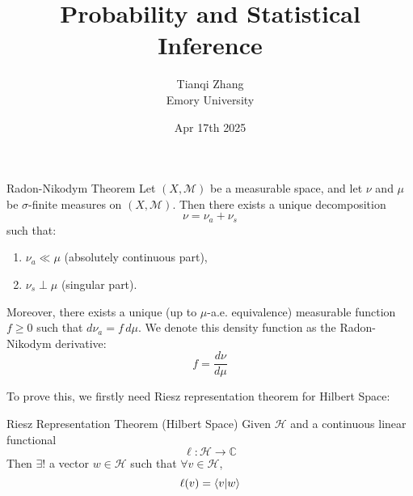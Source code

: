 

\title{\textbf{%
               Probability and Statistical Inference}}
\author{Tianqi Zhang\\
Emory University}
\date{Apr 17th 2025}


\maketitle
\setcounter{tocdepth}{1} %


\begin{thm}{Radon-Nikodym Theorem}
Let $(X, \mathcal{M})$ be a measurable space, and let $\nu$ and $\mu$ be $\sigma$-finite measures on $(X, \mathcal{M})$. Then there exists a unique decomposition
$$\nu = \nu_a + \nu_s$$
such that:
\begin{enumerate}
	\item $\nu_a \ll \mu$ (absolutely continuous part),
	\item $\nu_s \perp \mu$ (singular part).
\end{enumerate}
Moreover, there exists a unique (up to $\mu$-a.e. equivalence) measurable function $f \geq 0$ such that
$d\nu_a = f \, d\mu$.
We denote this density function as the Radon-Nikodym derivative:
$$f = \frac{d\nu}{d\mu}$$
\end{thm}

To prove this, we firstly need Riesz representation theorem for Hilbert Space:\\

\begin{thm}{Riesz Representation Theorem (Hilbert Space)}
Given $\mathcal{H}$ and a continuous linear functional
$$\ell: \mathcal H \to \mathbb C$$
Then $\exists!$ a vector $w\in \mathcal{H}$ such that $\forall v\in \mathcal H$, 
$$\ell(v) = \bra{v}\ket{w}$$
\end{thm}
 
